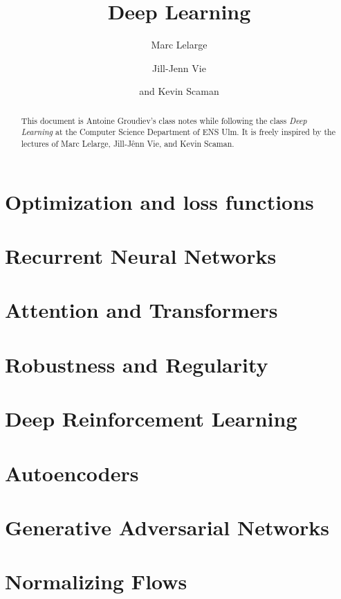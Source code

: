 \documentclass[toc, titlepaged]{../cs-classes/cs-classes}
\title{Deep Learning}
\author{Marc Lelarge\and Jill-Jenn Vie\and and Kevin Scaman}
\begin{document}
\begin{abstract}
    This document is Antoine Groudiev's class notes while following the class \emph{Deep Learning} at the Computer Science Department of ENS Ulm. It is freely inspired by the lectures of Marc Lelarge, Jill-Jênn Vie, and Kevin Scaman. 
\end{abstract}






\section{Optimization and loss functions}



\section{Recurrent Neural Networks}

\section{Attention and Transformers}

\section{Robustness and Regularity}

\section{Deep Reinforcement Learning}

\section{Autoencoders}

\section{Generative Adversarial Networks}

\section{Normalizing Flows}
\end{document}
